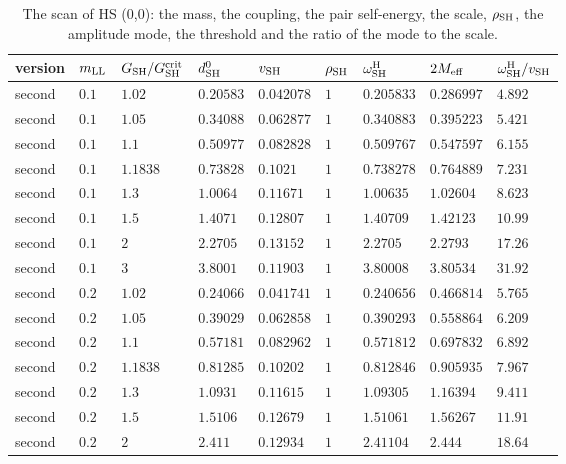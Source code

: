\documentclass[aps,prd,onecolumn,superscriptaddress,nofootinbib,floatfix,longbibliography]{revtex4-2}
\newcommand{\SH}{{\rm SH}}
\begin{document}
\begin{table}[!htbp]
\caption{\label{tab:scan}The scan of HS (0,0): the mass, the coupling, the pair self-energy, the scale, $\rho_\SH$, the amplitude mode, the threshold and the ratio of the mode to the scale.}
\begingroup\centering\footnotesize\setlength{\tabcolsep}{4pt}
\begin{tabular}{lllllllll}
\hline\hline
version & $m_{\rm LL}$ & $G_{\rm SH}/G^{\rm crit}_{\rm SH}$ & $d^0_{\rm SH}$ & $v_{\rm SH}$ & $\rho_{\rm SH}$ & $\omega^{\rm H}_{\rm SH}$ & $2M_{\rm eff}$ & $\omega^{\rm H}_{\rm SH}/v_{\rm SH}$ \\ \hline
second & $0.1$ & $1.02$ & $0.20583$ & $0.042078$ & $1$ & $0.205833$ & $0.286997$ & $4.892$ \\
second & $0.1$ & $1.05$ & $0.34088$ & $0.062877$ & $1$ & $0.340883$ & $0.395223$ & $5.421$ \\
second & $0.1$ & $1.1$ & $0.50977$ & $0.082828$ & $1$ & $0.509767$ & $0.547597$ & $6.155$ \\
second & $0.1$ & $1.1838$ & $0.73828$ & $0.1021$ & $1$ & $0.738278$ & $0.764889$ & $7.231$ \\
second & $0.1$ & $1.3$ & $1.0064$ & $0.11671$ & $1$ & $1.00635$ & $1.02604$ & $8.623$ \\
second & $0.1$ & $1.5$ & $1.4071$ & $0.12807$ & $1$ & $1.40709$ & $1.42123$ & $10.99$ \\
second & $0.1$ & $2$ & $2.2705$ & $0.13152$ & $1$ & $2.2705$ & $2.2793$ & $17.26$ \\
second & $0.1$ & $3$ & $3.8001$ & $0.11903$ & $1$ & $3.80008$ & $3.80534$ & $31.92$ \\
second & $0.2$ & $1.02$ & $0.24066$ & $0.041741$ & $1$ & $0.240656$ & $0.466814$ & $5.765$ \\
second & $0.2$ & $1.05$ & $0.39029$ & $0.062858$ & $1$ & $0.390293$ & $0.558864$ & $6.209$ \\
second & $0.2$ & $1.1$ & $0.57181$ & $0.082962$ & $1$ & $0.571812$ & $0.697832$ & $6.892$ \\
second & $0.2$ & $1.1838$ & $0.81285$ & $0.10202$ & $1$ & $0.812846$ & $0.905935$ & $7.967$ \\
second & $0.2$ & $1.3$ & $1.0931$ & $0.11615$ & $1$ & $1.09305$ & $1.16394$ & $9.411$ \\
second & $0.2$ & $1.5$ & $1.5106$ & $0.12679$ & $1$ & $1.51061$ & $1.56267$ & $11.91$ \\
second & $0.2$ & $2$ & $2.411$ & $0.12934$ & $1$ & $2.41104$ & $2.444$ & $18.64$ \\

\end{tabular}
\end{table}
\end{document}
